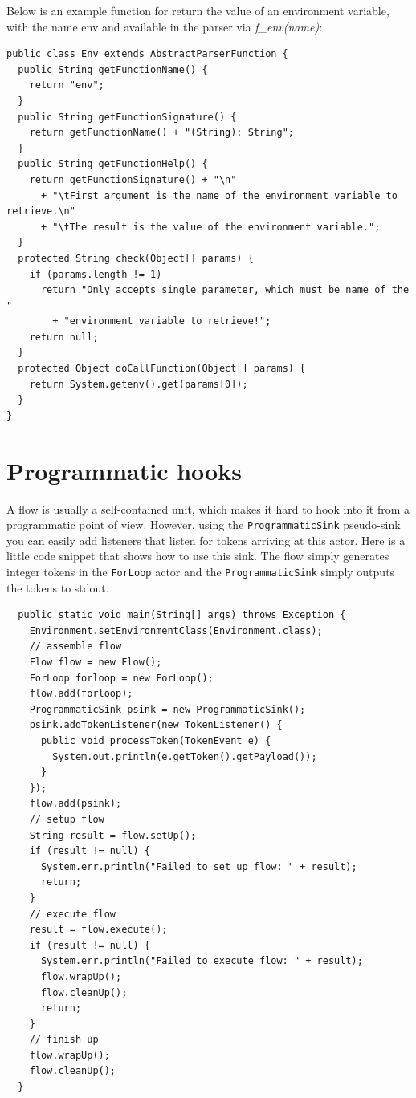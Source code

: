 Below is an example function for return the value of an environment variable, 
with the name env and available in the parser via \textit{f\_env(name)}:
{\small
\begin{verbatim}
public class Env extends AbstractParserFunction {
  public String getFunctionName() {
    return "env";
  }
  public String getFunctionSignature() {
    return getFunctionName() + "(String): String";
  }
  public String getFunctionHelp() {
    return getFunctionSignature() + "\n"
      + "\tFirst argument is the name of the environment variable to retrieve.\n"
      + "\tThe result is the value of the environment variable.";
  }
  protected String check(Object[] params) {
    if (params.length != 1)
      return "Only accepts single parameter, which must be name of the "
        + "environment variable to retrieve!";
    return null;
  }
  protected Object doCallFunction(Object[] params) {
    return System.getenv().get(params[0]);
  }
}
\end{verbatim}
}

\section{Programmatic hooks}
A flow is usually a self-contained unit, which makes it hard to hook into it
from a programmatic point of view. However, using the \texttt{ProgrammaticSink}
pseudo-sink you can easily add listeners that listen for tokens arriving at
this actor.
Here is a little code snippet that shows how to use this sink. The flow simply
generates integer tokens in the \texttt{ForLoop} actor and the \texttt{ProgrammaticSink}
simply outputs the tokens to stdout.
\begin{verbatim}
  public static void main(String[] args) throws Exception {
    Environment.setEnvironmentClass(Environment.class);
    // assemble flow
    Flow flow = new Flow();
    ForLoop forloop = new ForLoop();
    flow.add(forloop);
    ProgrammaticSink psink = new ProgrammaticSink();
    psink.addTokenListener(new TokenListener() {
      public void processToken(TokenEvent e) {
        System.out.println(e.getToken().getPayload());
      }
    });
    flow.add(psink);
    // setup flow
    String result = flow.setUp();
    if (result != null) {
      System.err.println("Failed to set up flow: " + result);
      return;
    }
    // execute flow
    result = flow.execute();
    if (result != null) {
      System.err.println("Failed to execute flow: " + result);
      flow.wrapUp();
      flow.cleanUp();
      return;
    }
    // finish up
    flow.wrapUp();
    flow.cleanUp();
  }
\end{verbatim}
